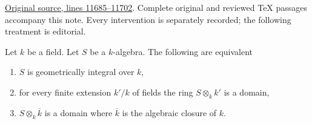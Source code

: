 \hypertarget{algebra-context-155}{}

\noindent\href{https://github.com/stacks/stacks-project/blob/a04446e57ec1fbc252a871afcec7752fb2807b14/algebra.tex\#L11685}{Original source, lines 11685--11702}. Complete original and reviewed TeX passages accompany this note. Every intervention is separately recorded; the following treatment is editorial.


\begin{lemma}
\label{editorial-source-lemma-characterize-geometrically-integral}
Let $k$ be a field. Let $S$ be a $k$-algebra.
The following are equivalent
\begin{enumerate}
\item $S$ is geometrically integral over $k$,
\item for every finite extension $k'/k$ of fields
the ring $S \otimes_k k'$ is a domain,
\item $S \otimes_k \overline{k}$ is a domain
where $\overline{k}$ is the algebraic closure of $k$.
\end{enumerate}
\end{lemma}

